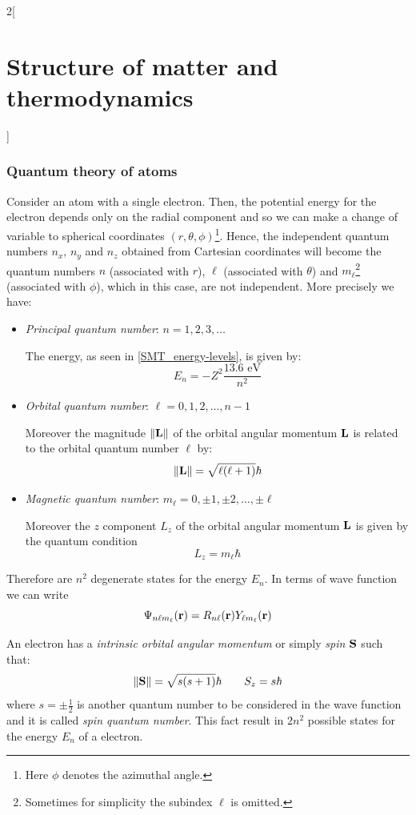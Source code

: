\documentclass[../../../main.tex]{subfiles}
\begin{document}
\begin{multicols}{2}[\section{Structure of matter and thermodynamics}]
  \subsubsection{Quantum theory of atoms}
  \begin{definition}
    Consider an atom with a single electron. Then, the potential energy for the electron depends only on the radial component and so we can make a change of variable to spherical coordinates $(r,\theta,\phi)$\footnote{Here $\phi$ denotes the azimuthal angle.}. Hence, the independent quantum numbers $n_x$, $n_y$ and $n_z$ obtained from Cartesian coordinates will become the quantum numbers $n$ (associated with $r$), $\ell$ (associated with $\theta$) and $m_\ell$\footnote{Sometimes for simplicity the subindex $\ell$ is omitted.} (associated with $\phi$), which in this case, are not independent. More precisely we have:
    \begin{itemize}
      \item \textit{Principal quantum number}: $n=1,2,3,\ldots$\par
            The energy, as seen in \cref{SMT_energy-levels}, is given by: $$E_n=-Z^2\frac{13.6\text{ eV}}{n^2}$$
      \item \textit{Orbital quantum number}: $\ell=0,1,2,\ldots,n-1$\par Moreover the magnitude $\|\boldsymbol{\mathrm{L}}\|$ of the orbital angular momentum $\boldsymbol{\mathrm{L}}$ is related to the orbital quantum number $\ell$ by: $$\|\boldsymbol{\mathrm{L}}\|=\sqrt{\ell(\ell+1)}\hbar$$
      \item \textit{Magnetic quantum number}: $m_\ell=0,\pm 1,\pm 2,\ldots,\pm\ell$\par
            Moreover the $z$ component $L_z$ of the orbital angular momentum $\boldsymbol{\mathrm{L}}$ is given by the quantum condition $$L_z=m_\ell\hbar$$
    \end{itemize}
    Therefore are $n^2$ degenerate states for the energy $E_n$.
    In terms of wave function we can write $$\Psi_{n\ell m_\ell}(\boldsymbol{\mathrm{r}})=R_{n\ell}(\boldsymbol{\mathrm{r}})Y_{\ell m_\ell}(\boldsymbol{\mathrm{r}})$$
  \end{definition}
  \begin{definition}[Spin]
    An electron has a \textit{intrinsic orbital angular momentum} or simply \textit{spin $\boldsymbol{\mathrm{S}}$} such that:
    $$\|\boldsymbol{\mathrm{S}}\|=\sqrt{s(s+1)}\hbar\qquad S_z=s\hbar$$ where $s=\pm\frac{1}{2}$ is another quantum number  to be considered in the wave function and it is called \textit{spin quantum number}. This fact result in $2n^2$ possible states for the energy $E_n$ of a electron.

\end{definition}
\end{multicols}
\end{document}
